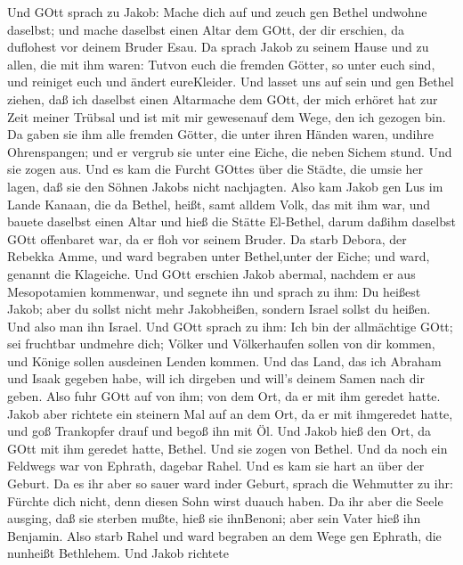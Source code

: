  Und GOtt sprach zu Jakob: Mache dich auf und zeuch gen
Bethel undwohne daselbst; und mache daselbst einen Altar dem GOtt, der
dir erschien, da duflohest vor deinem Bruder Esau.  Da
sprach Jakob zu seinem Hause und zu allen, die mit ihm waren: Tutvon
euch die fremden Götter, so unter euch sind, und reiniget euch und
ändert eureKleider.  Und lasset uns auf sein und gen Bethel
ziehen, daß ich daselbst einen Altarmache dem GOtt, der mich erhöret hat
zur Zeit meiner Trübsal und ist mit mir gewesenauf dem Wege, den ich
gezogen bin.  Da gaben sie ihm alle fremden Götter, die
unter ihren Händen waren, undihre Ohrenspangen; und er vergrub sie unter
eine Eiche, die neben Sichem stund.  Und sie zogen aus. Und
es kam die Furcht GOttes über die Städte, die umsie her lagen, daß sie
den Söhnen Jakobs nicht nachjagten.  Also kam Jakob gen Lus
im Lande Kanaan, die da Bethel, heißt, samt alldem Volk, das mit ihm
war,  und bauete daselbst einen Altar und hieß die Stätte
El-Bethel, darum daßihm daselbst GOtt offenbaret war, da er floh vor
seinem Bruder.  Da starb Debora, der Rebekka Amme, und ward
begraben unter Bethel,unter der Eiche; und ward, genannt die Klageiche.
 Und GOtt erschien Jakob abermal, nachdem er aus
Mesopotamien kommenwar, und segnete ihn  und sprach zu ihm:
Du heißest Jakob; aber du sollst nicht mehr Jakobheißen, sondern Israel
sollst du heißen. Und also man ihn Israel.  Und GOtt sprach
zu ihm: Ich bin der allmächtige GOtt; sei fruchtbar undmehre dich;
Völker und Völkerhaufen sollen von dir kommen, und Könige sollen
ausdeinen Lenden kommen.  Und das Land, das ich Abraham und
Isaak gegeben habe, will ich dirgeben und will's deinem Samen nach dir
geben.  Also fuhr GOtt auf von ihm; von dem Ort, da er mit
ihm geredet hatte.  Jakob aber richtete ein steinern Mal
auf an dem Ort, da er mit ihmgeredet hatte, und goß Trankopfer drauf und
begoß ihn mit Öl.  Und Jakob hieß den Ort, da GOtt mit ihm
geredet hatte, Bethel.  Und sie zogen von Bethel. Und da
noch ein Feldwegs war von Ephrath, dagebar Rahel.  Und es
kam sie hart an über der Geburt. Da es ihr aber so sauer ward inder
Geburt, sprach die Wehmutter zu ihr: Fürchte dich nicht, denn diesen
Sohn wirst duauch haben.  Da ihr aber die Seele ausging,
daß sie sterben mußte, hieß sie ihnBenoni; aber sein Vater hieß ihn
Benjamin.  Also starb Rahel und ward begraben an dem Wege
gen Ephrath, die nunheißt Bethlehem.  Und Jakob richtete
